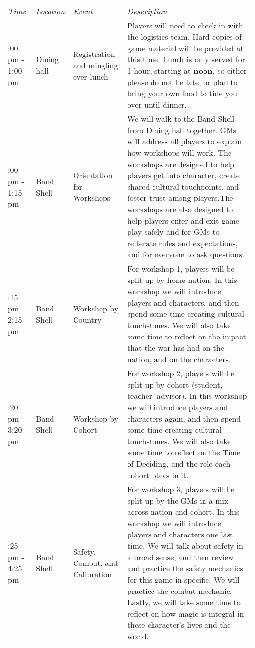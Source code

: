 \documentclass[green]{GL2020}
\begin{document}
\begin{tabularx}{\textwidth}{|>{\centering\arraybackslash} m{1.5cm} | >{\centering\arraybackslash} m{1.8cm} | >{\centering\arraybackslash} m{1.8cm} | >{\centering\arraybackslash}X |}
 \hline
\multicolumn{4}{|c|}{\textbf{Friday (Pre-Game Activities) 12:00 pm}} \\
\hline 
 \emph{Time} & \emph{Location} & \emph{Event} & \emph{Description}\\
\hline
 12:00 pm - 1:00 pm   & Dining hall & Registration and mingling over lunch &  Players will need to check in with the logistics team. Hard copies of game material will be provided at this time. Lunch is only served for 1 hour, starting at \textbf{noon}, so either please do not be late, or plan to bring your own food to tide you over until dinner. \\
    \hline
  1:00 pm - 1:15 pm  & Band Shell  & Orientation for Workshops & We will walk to the Band Shell from Dining hall together. GMs will address all players to explain how workshops will work. The workshops are designed to help players get into character, create shared cultural touchpoints, and foster trust among players.The workshops are also designed to help players enter and exit game play safely and for GMs to reiterate rules and expectations, and for everyone to ask questions. \\
    \hline
  1:15 pm - 2:15 pm & Band Shell & Workshop by Country & For workshop 1, players will be split up by home nation. In this workshop we will introduce players and characters, and then spend some time creating cultural touchstones. We will also take some time to reflect on the impact that the war has had on the nation, and on the characters.  \\
    \hline
  2:20 pm - 3:20 pm & Band Shell  & Workshop by Cohort & For workshop 2, players will be split up by cohort (student, teacher, advisor). In this workshop we will introduce players and characters again, and then spend some time creating cultural touchstones. We will also take some time to reflect on the Time of Deciding, and the role each cohort plays in it. \\
 \hline
  3:25 pm - 4:25 pm & Band Shell  & Safety, Combat, and Calibration & For workshop 3, players will be split up by the GMs in a mix across nation and cohort. In this workshop we will introduce players and characters one last time. We will talk about safety in a broad sense, and then review and practice the safety mechanics for this game in specific. We will practice the combat mechanic. Lastly, we will take some time to reflect on how magic is integral in these character’s lives and the world. \\

\end{tabularx}
\end{document}
